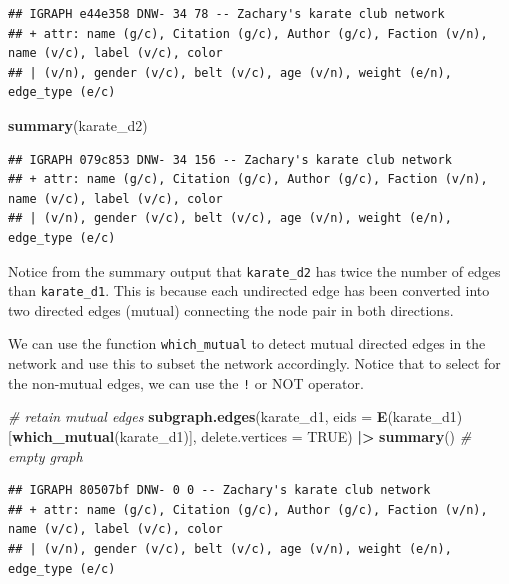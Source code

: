 \documentclass[
]{book}
\newenvironment{Shaded}{\begin{snugshade}}{\end{snugshade}}
\newcommand{\AttributeTok}[1]{\textcolor[rgb]{0.13,0.29,0.53}{#1}}
\newcommand{\CommentTok}[1]{\textcolor[rgb]{0.56,0.35,0.01}{\textit{#1}}}
\newcommand{\ConstantTok}[1]{\textcolor[rgb]{0.56,0.35,0.01}{#1}}
\newcommand{\FunctionTok}[1]{\textcolor[rgb]{0.13,0.29,0.53}{\textbf{#1}}}
\newcommand{\NormalTok}[1]{#1}
\newcommand{\SpecialCharTok}[1]{\textcolor[rgb]{0.81,0.36,0.00}{\textbf{#1}}}
\begin{document}
\begin{verbatim}
## IGRAPH e44e358 DNW- 34 78 -- Zachary's karate club network
## + attr: name (g/c), Citation (g/c), Author (g/c), Faction (v/n), name (v/c), label (v/c), color
## | (v/n), gender (v/c), belt (v/c), age (v/n), weight (e/n), edge_type (e/c)
\end{verbatim}

\begin{Shaded}
\begin{Highlighting}[]
\FunctionTok{summary}\NormalTok{(karate\_d2)}
\end{Highlighting}
\end{Shaded}

\begin{verbatim}
## IGRAPH 079c853 DNW- 34 156 -- Zachary's karate club network
## + attr: name (g/c), Citation (g/c), Author (g/c), Faction (v/n), name (v/c), label (v/c), color
## | (v/n), gender (v/c), belt (v/c), age (v/n), weight (e/n), edge_type (e/c)
\end{verbatim}

Notice from the summary output that \texttt{karate\_d2} has twice the number of edges than \texttt{karate\_d1}. This is because each undirected edge has been converted into two directed edges (mutual) connecting the node pair in both directions.

We can use the function \texttt{which\_mutual} to detect mutual directed edges in the network and use this to subset the network accordingly. Notice that to select for the non-mutual edges, we can use the \texttt{!} or NOT operator.

\begin{Shaded}
\begin{Highlighting}[]
\CommentTok{\# retain mutual edges }
\FunctionTok{subgraph.edges}\NormalTok{(karate\_d1, }\AttributeTok{eids =} \FunctionTok{E}\NormalTok{(karate\_d1)[}\FunctionTok{which\_mutual}\NormalTok{(karate\_d1)], }\AttributeTok{delete.vertices =} \ConstantTok{TRUE}\NormalTok{) }\SpecialCharTok{|\textgreater{}} 
  \FunctionTok{summary}\NormalTok{() }\CommentTok{\# empty graph}
\end{Highlighting}
\end{Shaded}

\begin{verbatim}
## IGRAPH 80507bf DNW- 0 0 -- Zachary's karate club network
## + attr: name (g/c), Citation (g/c), Author (g/c), Faction (v/n), name (v/c), label (v/c), color
## | (v/n), gender (v/c), belt (v/c), age (v/n), weight (e/n), edge_type (e/c)
\end{verbatim}
\end{document}
